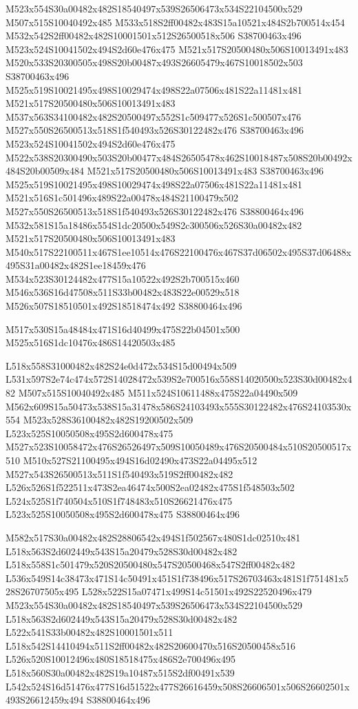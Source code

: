 \documentclass{article}
\begin{document}
\begin{multicols}{2}
M523x554S30a00482x482S18540497x539S26506473x534S22104500x529 M507x515S10040492x485 M533x518S2ff00482x483S15a10521x484S2b700514x454 M532x542S2ff00482x482S10001501x512S26500518x506 S38700463x496 M523x524S10041502x494S2d60e476x475 M521x517S20500480x506S10013491x483 M520x533S20300505x498S20b00487x493S26605479x467S10018502x503 S38700463x496 M525x519S10021495x498S10029474x498S22a07506x481S22a11481x481 M521x517S20500480x506S10013491x483 M537x563S34100482x482S20500497x552S1c509477x526S1c500507x476 M527x550S26500513x518S1f540493x526S30122482x476 S38700463x496 M523x524S10041502x494S2d60e476x475 M522x538S20300490x503S20b00477x484S26505478x462S10018487x508S20b00492x484S20b00509x484 M521x517S20500480x506S10013491x483 S38700463x496 M525x519S10021495x498S10029474x498S22a07506x481S22a11481x481 M521x516S1c501496x489S22a00478x484S21100479x502 M527x550S26500513x518S1f540493x526S30122482x476 S38800464x496 M532x581S15a18486x554S1dc20500x549S2c300506x526S30a00482x482 M521x517S20500480x506S10013491x483 M540x517S22100511x467S1ee10514x476S22100476x467S37d06502x495S37d06488x495S31a00482x482S1ee18459x476 M534x523S30124482x477S15a10522x492S2b700515x460 M546x536S16d47508x511S33b00482x483S22e00529x518 M526x507S18510501x492S18518474x492 S38800464x496

\begin{center}
M517x530S15a48484x471S16d40499x475S22b04501x500 M525x516S1dc10476x486S14420503x485 
\end{center}


L518x558S31000482x482S24e0d472x534S15d00494x509 L531x597S2e74c474x572S14028472x539S2e700516x558S14020500x523S30d00482x482 M507x515S10040492x485 M511x524S10611488x475S22a04490x509 M562x609S15a50473x538S15a31478x586S24103493x555S30122482x476S24103530x554 M523x528S36100482x482S19200502x509 L523x525S10050508x495S2d600478x475 M527x523S10058472x476S26526497x509S10050489x476S20500484x510S20500517x510 M510x527S21100495x494S16d02490x473S22a04495x512 M527x543S26500513x511S1f540493x519S2ff00482x482 L526x526S1f522511x473S2ea46474x500S2ea02482x475S1f548503x502 L524x525S1f740504x510S1f748483x510S26621476x475 L523x525S10050508x495S2d600478x475 S38800464x496

M582x517S30a00482x482S28806542x494S1f502567x480S1dc02510x481 L518x563S2d602449x543S15a20479x528S30d00482x482 L518x558S1c501479x520S20500480x547S20500468x547S2ff00482x482 L536x549S14c38473x471S14c50491x451S1f738496x517S26703463x481S1f751481x528S26707505x495 L528x522S15a07471x499S14c51501x492S22520496x479 M523x554S30a00482x482S18540497x539S26506473x534S22104500x529 L518x563S2d602449x543S15a20479x528S30d00482x482 L522x541S33b00482x482S10001501x511 L518x542S14410494x511S2ff00482x482S20600470x516S20500458x516 L526x520S10012496x480S18518475x486S2e700496x495 L518x560S30a00482x482S19a10487x515S2df00491x539 L542x524S16d51476x477S16d51522x477S26616459x508S26606501x506S26602501x493S26612459x494 S38800464x496


\end{multicols}
\end{document}
